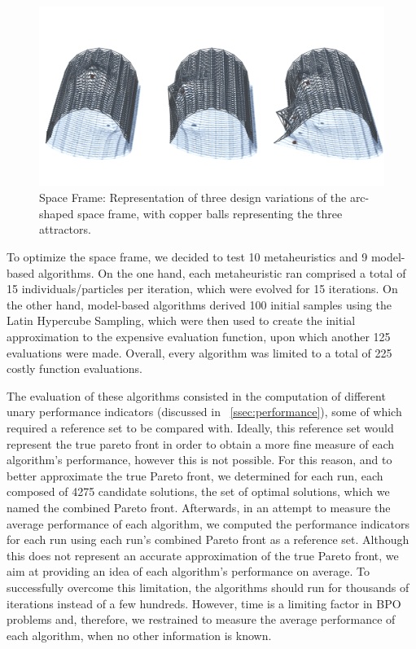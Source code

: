 \begin{figure}[htbp]
	\centering
	\includegraphics[width=1\textwidth]{Images/Evaluation/truss-kat.png}
	\caption[Space Frame: Representation of three space frame design variants]{Space Frame: Representation of three design variations of the arc-shaped space frame, with copper balls representing the three attractors.}
	\label{fig:spaceframe}
\end{figure}

To optimize the space frame, we decided to test 10 metaheuristics and 9 model-based algorithms. On the one hand, each metaheuristic ran comprised a total of 15 individuals/particles per iteration, which were evolved for 15 iterations. On the other hand, model-based algorithms derived 100 initial samples using the Latin Hypercube Sampling, which were then used to create the initial approximation to the expensive evaluation function, upon which another 125 evaluations were made. Overall, every algorithm was limited to a total of 225 costly function evaluations. 

The evaluation of these algorithms consisted in the computation of different unary performance indicators (discussed in ~\cref{ssec:performance}), some of which required a reference set to be compared with. Ideally, this reference set would represent the true pareto front in order to obtain a more fine measure of each algorithm's performance, however this is not possible. For this reason, and to better approximate the true Pareto front, we determined for each run, each composed of 4275 candidate solutions, the set of optimal solutions, which we named the combined Pareto front. Afterwards, in an attempt to measure the average performance of each algorithm, we computed the performance indicators for each run using each run's combined Pareto front as a reference set. Although this does not represent an accurate approximation of the true Pareto front, we aim at providing an idea of each algorithm's performance on average. To successfully overcome this limitation, the algorithms should run for thousands of iterations instead of a few hundreds. However, time is a limiting factor in \ac{BPO} problems and, therefore, we restrained to measure the average performance of each algorithm, when no other information is known.

